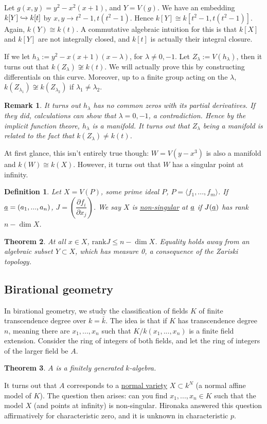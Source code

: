 \documentclass[letterpaper, 12pt]{article}
\newtheorem{rmk}{Remark}
\newtheorem{thm}{Theorem}[subsection]
\newtheorem{definition}[thm]{Definition}
\newcommand{\iso}{\cong}
\begin{document}
Let $g(x,y) = y^2 - x^2(x + 1)$, and $Y = V(g)$. We have an embedding $k[Y] \xhookrightarrow{} k[t]$ by $x, y \rightarrow t^2 - 1, t(t^2 - 1)$. Hence $k[Y] \iso k[t^2 - 1, t(t^2 - 1)]$. Again, $k(Y) \iso k(t)$. A commutative algebraic intuition for this is that $k[X]$ and $k[Y]$ are not integrally closed, and $k[t]$ is actually their integral closure.

If we let $h_\lambda := y^2 - x(x + 1)(x - \lambda)$, for $\lambda \neq 0, -1$. Let $Z_\lambda := V(h_\lambda)$, then it turns out that $k(Z_\lambda) \not \iso k(t)$. We will actually prove this by constructing differentials on this curve. Moreover, up to a finite group acting on the $\lambda$, $k(Z_{\lambda_1}) \not \iso k(Z_{\lambda_2})$ if $\lambda_1 \neq \lambda_2$.

\begin{rmk}
It turns out $h_\lambda$ has no common zeros with its partial derivatives. If they did, calculations can show that $\lambda = 0, -1$, a contradiction. Hence by the implicit function theore, $h_\lambda$ is a manifold. It turns out that $Z_\lambda$ being a manifold is related to the fact that $k(Z_\lambda) \neq k(t)$.
\end{rmk}

At first glance, this isn't entirely true though: $W = V(y - x^3)$ is also a manifold and $k(W) \iso k(X)$. However, it turns out that $W$ has a singular point at infinity.

\begin{definition}
  Let $X = V(P)$, some prime ideal $P$, $P = \langle f_1, ..., f_m \rangle$. If $\uline{a} = (a_1, ..., a_n)$, $J = \left( \dfrac{\partial f_i}{\partial x_j} \right)$. We say $X$ is \uline{non-singular} at $\uline{a}$ if $J(\uline{a})$ has rank $n - \dim X$.
\end{definition}

\begin{thm}
At all $x \in X$, $\mathrm{rank} J \leq n - \dim X$. Equality holds away from an algebraic subset $Y \subset X$, which has measure 0, a consequence of the Zariski topology.
\end{thm}

\subsection{Birational geometry}
In birational geometry, we study the classification of fields $K$ of finite transcendence degree over $k = \bar{k}$. The idea is that if $K$ has transcendence degree $n$, meaning there are $x_1, ..., x_n$ such that $K/k(x_1, ..., x_n)$ is a finite field extension. Consider the ring of integers of both fields, and let the ring of integers of the larger field be $A$.

\begin{thm}
$A$ is a finitely generated $k$-algebra.
\end{thm}

It turns out that $A$ corresponds to a \uline{normal variety} $X \subset k^N$ (a normal affine model of $K$). The question then arises: can you find $x_1, ..., x_n \in K$ such that the model $X$ (and points at infinity) is non-singular. Hironaka answered this question affirmatively for characteristic zero, and it is unknown in characteristic $p$.
\end{document}
